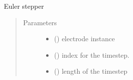 \documentclass[letterpaper,10pt,english]{sphinxmanual}
\begin{document}
\begin{fulllineitems}
\label{\detokenize{solver:solver.euler_step}}
\sphinxAtStartPar
Euler stepper
\begin{quote}\begin{description}
\item[{Parameters}] \leavevmode\begin{itemize}
\item {} 
\sphinxAtStartPar
{} (\sphinxstyleliteralemphasis{\sphinxupquote{{[}}}\sphinxstyleliteralemphasis{\sphinxupquote{{]}}}) \textendash{} electrode instance

\item {} 
\sphinxAtStartPar
{} (\sphinxstyleliteralemphasis{\sphinxupquote{{[}}}\sphinxstyleliteralemphasis{\sphinxupquote{{]}}}) \textendash{} index for the timestep.

\item {} 
\sphinxAtStartPar
{} (\sphinxstyleliteralemphasis{\sphinxupquote{{[}}}\sphinxstyleliteralemphasis{\sphinxupquote{{]}}}) \textendash{} length of the timestep

\end{itemize}

\end{description}\end{quote}

\end{fulllineitems}

\end{document}
